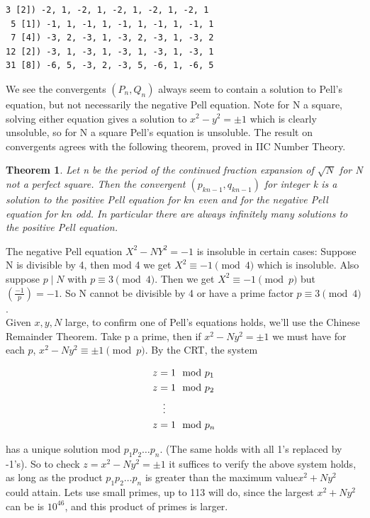 \documentclass[10pt,a4paper]{report}
\newcommand{\legendre}[2]{(\frac{#1}{#2})}
\newtheorem*{theorem}{Theorem}
\begin{document}
\begin{lstlisting}[breaklines]
 3 [2]) -2, 1, -2, 1, -2, 1, -2, 1, -2, 1
 5 [1]) -1, 1, -1, 1, -1, 1, -1, 1, -1, 1
 7 [4]) -3, 2, -3, 1, -3, 2, -3, 1, -3, 2
12 [2]) -3, 1, -3, 1, -3, 1, -3, 1, -3, 1
31 [8]) -6, 5, -3, 2, -3, 5, -6, 1, -6, 5
\end{lstlisting}

We see the convergents $(P_n, Q_n)$ always seem to contain a solution to Pell's equation, but not necessarily the negative Pell equation.  Note for N a square, solving either equation gives a solution to $x^2-y^2=\pm 1$ which is clearly unsoluble, so for N a square Pell's equation is unsoluble. The result on convergents agrees with the following theorem, proved in IIC Number Theory.

\begin{theorem}
Let n be the period of the continued fraction expansion of $\sqrt{N}$ for N not a perfect square. Then the convergent $(p_{kn-1},q_{kn-1})$ for integer k is a solution to the positive Pell equation for $kn$ even and for the negative Pell equation for $kn$ odd. In particular there are always infinitely many solutions to the positive Pell equation.
\end{theorem}



The negative Pell equation $X^2-NY^2=-1$ is insoluble in certain cases: Suppose N is divisible by 4, then mod 4 we get $X^2\equiv-1\pmod 4$ which is insoluble. Also suppose $p\mid N$ with $p\equiv 3 \pmod 4$. Then we get $X^2\equiv-1\pmod p$ but $\legendre{-1}{p}=-1$. So N cannot be divisible by 4 or have a prime factor $p\equiv 3\pmod 4$.\\

Given $x,y,N$ large, to confirm one of Pell's equations holds, we'll use the Chinese Remainder Theorem. Take p a prime, then if $x^2-Ny^2=\pm 1$ we must have for each $p$, $x^2-Ny^2\equiv\pm 1 \pmod{p}$. By the CRT, the system

\begin{align*}
   z &= 1 \mod p_1\\
   z &= 1 \mod p_2\\
   &\vdotswithin{=} \notag \\
   z &= 1 \mod p_n\\
\end{align*}

has a unique solution mod $p_1p_2\dots p_n$. (The same holds with all 1's replaced by -1's). So to check $z=x^2-Ny^2= \pm 1$ it suffices to verify the above system holds, as long as the product $p_1p_2\dots p_n$ is greater than the maximum value$x^2+Ny^2$ could attain. Lets use small primes, up to 113 will do, since the largest $x^2+Ny^2$ can be is $10^{46}$, and this product of primes is larger. \\
\end{document}
